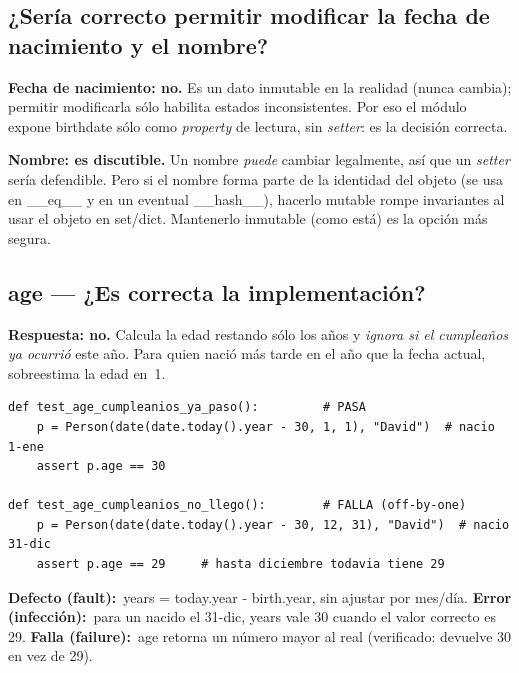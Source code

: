 \documentclass[11pt,a4paper]{article}
\newcommand{\defecto}{\textbf{\textcolor{bad}{Defecto (fault):}}\ }
\newcommand{\error}{\textbf{\textcolor{bad}{Error (infección):}}\ }
\newcommand{\falla}{\textbf{\textcolor{bad}{Falla (failure):}}\ }
\newcommand{\code}[1]{\colorbox{codebg}{\ttfamily\small #1}}
\begin{document}
\subsection{¿Sería correcto permitir modificar la fecha de nacimiento y el nombre?}
\begin{answer}
\textbf{Fecha de nacimiento: no.} Es un dato inmutable en la realidad (nunca cambia); permitir
modificarla sólo habilita estados inconsistentes. Por eso el módulo expone \code{birthdate} sólo
como \emph{property} de lectura, sin \emph{setter}: es la decisión correcta.
\smallskip

\textbf{Nombre: es discutible.} Un nombre \emph{puede} cambiar legalmente, así que un \emph{setter}
sería defendible. Pero si el nombre forma parte de la identidad del objeto (se usa en \code{\_\_eq\_\_}
y en un eventual \code{\_\_hash\_\_}), hacerlo mutable rompe invariantes al usar el objeto en
\code{set}/\code{dict}. Mantenerlo inmutable (como está) es la opción más segura.
\end{answer}

\subsection{\code{age} --- ¿Es correcta la implementación?}
\begin{answer}
\textbf{Respuesta: no.} Calcula la edad restando sólo los años y \emph{ignora si el cumpleaños ya
ocurrió} este año. Para quien nació más tarde en el año que la fecha actual, sobreestima la edad en~1.
\end{answer}

\begin{lstlisting}[style=py]
def test_age_cumpleanios_ya_paso():         # PASA
    p = Person(date(date.today().year - 30, 1, 1), "David")  # nacio 1-ene
    assert p.age == 30

def test_age_cumpleanios_no_llego():        # FALLA (off-by-one)
    p = Person(date(date.today().year - 30, 12, 31), "David")  # nacio 31-dic
    assert p.age == 29     # hasta diciembre todavia tiene 29
\end{lstlisting}

\begin{def-err-fail}
\defecto \code{years = today.year - birth.year}, sin ajustar por mes/día.\quad
\error para un nacido el 31-dic, \code{years} vale \code{30} cuando el valor correcto es \code{29}.\quad
\falla \code{age} retorna un número mayor al real (verificado: devuelve \code{30} en vez de \code{29}).
\end{def-err-fail}
\end{document}
